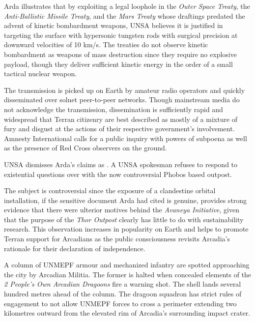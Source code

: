 Arda illustrates that by exploiting a legal loophole in the {\it Outer Space Treaty}, the {\it Anti-Ballistic Missile Treaty}, and the {\it Mars Treaty} whose draftings predated the advent of kinetic bombardment weapons, UNSA believes it is justified in targeting the surface with hypersonic tungsten rods with surgical precision at downward velocities of 10 km/s. The treaties do not observe kinetic bombardment as weapons of mass destruction since they require no explosive payload, though they deliver sufficient kinetic energy in the order of a small tactical nuclear weapon.

The transmission is picked up on Earth by amateur radio operators and quickly disseminated over solnet peer-to-peer networks. Though mainstream media do not acknowledge the transmission, dissemination is sufficiently rapid and widespread that Terran citizenry are best described as mostly of a mixture of fury and disgust at the actions of their respective government's involvement. Amnesty International calls for a public inquiry with powers of subpoena as well as the presence of Red Cross observers on the ground.

UNSA dismisses Arda's claims as . A UNSA spokesman refuses to respond to existential questions over with the now controversial Phobos based outpost. 

The subject is controversial since the exposure of a clandestine orbital installation, if the sensitive document Arda had cited is genuine, provides strong evidence that there were ulterior motives behind the {\it Avaneya Initiative}, given that the purpose of the {\it Thor Outpost} clearly has little to do with sustainability research. This observation increases in popularity on Earth and helps to promote Terran support for Arcadians as the public consciousness revisits Arcadia's rationale for their declaration of independence.
\StopTimelineDate

A column of UNMEPF armour and mechanized infantry are spotted approaching the city by Arcadian Militia. The former is halted when concealed elements of the {\it 2 People's Own Arcadian Dragoons} fire a warning shot. The shell lands several hundred metres ahead of the column. The dragoon squadron has strict rules of engagement to not allow UNMEPF forces to cross a perimeter extending two kilometres outward from the elevated rim of Arcadia's surrounding impact crater.
\StopTimelineDate


